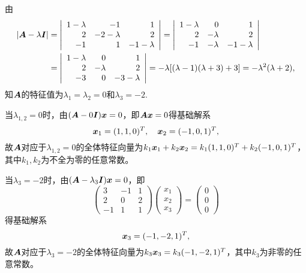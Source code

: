 \begin{jie}
  由
  $$
  \begin{aligned}
    |\boldsymbol{A}-\lambda\boldsymbol{I}|&=\left|
      \begin{array}{rrr}
        1-\lambda&-1&1\\
        2&-2-\lambda&2\\
        -1&1&-1-\lambda
      \end{array}
  \right|=\left|
    \begin{array}{rrr}
      1-\lambda&0&1\\
        2&-\lambda&2\\
        -1&-\lambda&-1-\lambda
    \end{array}
  \right|\\
  &=\left|
    \begin{array}{rrr}
      1-\lambda&0&1\\
      2&-\lambda&2\\
      -3&0&-3-\lambda
    \end{array}
  \right|=-\lambda[(\lambda-1)(\lambda+3)+3]=-\lambda^2(\lambda+2),
\end{aligned}
$$
知$\boldsymbol{A}$的特征值为$\lambda_1=\lambda_2=0$和$\lambda_3=-2$.

当$\lambda_{1,2}=0$时，由$(\boldsymbol{A}-0\boldsymbol{I}){\boldsymbol{x}}=0$，即$\boldsymbol{A}{\boldsymbol{x}}=0$得基础解系
$$
{\boldsymbol{x}}_1=(1,1,0)^T, \quad {\boldsymbol{x}}_2=(-1,0,1)^T,
$$
故$\boldsymbol{A}$对应于$\lambda_{1,2}=0$的全体特征向量为$k_1{\boldsymbol{x}}_1+k_2{\boldsymbol{x}}_2=k_1(1,1,0)^T+k_2(-1,0,1)^T$，其中$k_1,k_2$为不全为零的任意常数。


当$\lambda_{3}=-2$时，由$(\boldsymbol{A}-\lambda_{3}\boldsymbol{I}){\boldsymbol{x}}=0$，即
$$
\left(
  \begin{array}{rrr}
    3&-1&1\\
    2&0&2\\
    -1&1&1
  \end{array}
\right)\left(
  \begin{array}{c}
    x_1\\x_2\\x_3
  \end{array}
\right)=\left(
  \begin{array}{c}
    0\\0\\0
  \end{array}
\right)
$$得基础解系
$$
{\boldsymbol{x}}_3=(-1,-2,1)^T,
$$
故$\boldsymbol{A}$对应于$\lambda_{3}=-2$的全体特征向量为$k_3{\boldsymbol{x}}_3=k_3(-1,-2,1)^T$，其中$k_3$为非零的任意常数。



\end{jie}
